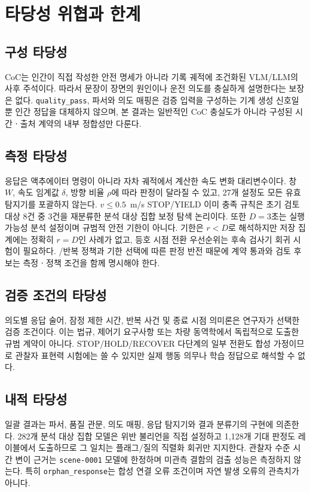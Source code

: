 \section{타당성 위협과 한계}
\label{sec:threats}

\subsection{구성 타당성}
CoC는 인간이 직접 작성한 안전 명세가 아니라 기록 궤적에 조건화된 VLM/LLM의 사후 주석이다. 따라서 문장이 장면의 원인이나 운전 의도를 충실하게 설명한다는 보장은 없다. \texttt{quality\_pass}, 파서와 의도 매핑은 검증 입력을 구성하는 기계 생성 신호일 뿐 인간 정답을 대체하지 않으며, 본 결과는 일반적인 CoC 충실도가 아니라 구성된 시간ㆍ출처 계약의 내부 정합성만 다룬다.

\subsection{측정 타당성}
응답은 액추에이터 명령이 아니라 자차 궤적에서 계산한 속도 변화 대리변수이다. 창 $W$, 속도 임계값 $\delta$, 방향 비율 $\rho$에 따라 판정이 달라질 수 있고, 27개 설정도 모든 유효 탐지기를 포괄하지 않는다. $v\leq0.5$~m/s STOP/YIELD 이미 충족 규칙은 초기 검토 대상 8건 중 3건을 재분류한 분석 대상 집합 보정 탐색 논리이다. 또한 $D=3$초는 실행 가능성 분석 설정이며 규범적 안전 기한이 아니다. 기한은 $r<D$로 해석하지만 저장 집계에는 정확히 $r=D$인 사례가 없고, 등호 시점 전환 우선순위는 후속 검사기 회귀 시험이 필요하다. \preserve/\reset 반복 정책과 기한 선택에 따른 판정 반전 때문에 계약 통과와 검토 후보는 측정ㆍ정책 조건을 함께 명시해야 한다.

\subsection{검증 조건의 타당성}
의도별 응답 술어, 잠정 제한 시간, 반복 사건 및 종료 시점 의미론은 연구자가 선택한 검증 조건이다. 이는 법규, 제어기 요구사항 또는 차량 동역학에서 독립적으로 도출한 규범 계약이 아니다. STOP/HOLD/RECOVER 다단계의 일부 전환도 합성 가정이므로 관찰자 표현력 시험에는 쓸 수 있지만 실제 행동 의무나 학습 정답으로 해석할 수 없다.

\subsection{내적 타당성}
일괄 결과는 파서, 품질 관문, 의도 매핑, 응답 탐지기와 결과 분류기의 구현에 의존한다. 282개 분석 대상 집합 모델은 위반 불리언을 직접 설정하고 1,128개 기대 판정도 레이블에서 도출하므로 그 일치는 플래그/질의 직렬화 회귀만 지지한다. 관찰자 수준 시간 변이 근거는 \texttt{scene-0001} 모델에 한정하며 미관측 결함의 검출 성능은 측정하지 않는다. 특히 \texttt{orphan\_response}는 합성 연결 오류 조건이며 자연 발생 오류의 관측치가 아니다.

